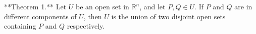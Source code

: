 **Theorem 1.** Let $U$ be an open set in $\mathbb{R}^n$, and let $P, Q \in U$. If $P$ and $Q$ are in different components of $U$, then $U$ is the union of two disjoint open sets containing $P$ and $Q$ respectively.
